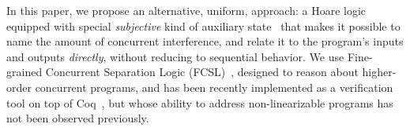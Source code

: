 In this paper, we propose an alternative, uniform, approach: a Hoare
logic equipped with special \emph{subjective} kind of auxiliary
state~\cite{LeyWild-Nanevski:POPL13} that makes it possible to name
the amount of concurrent interference, and relate it to the program's
inputs and outputs \emph{directly}, without reducing to sequential
behavior. We use Fine-grained Concurrent Separation Logic
(FCSL)~\cite{Nanevski-al:ESOP14}, designed to reason about
higher-order concurrent programs, and has been recently implemented as
a verification tool on top of Coq~\cite{Sergey-al:PLDI15}, but whose
ability to address non-linearizable programs has not been observed
previously.
%
%
%
%
%
